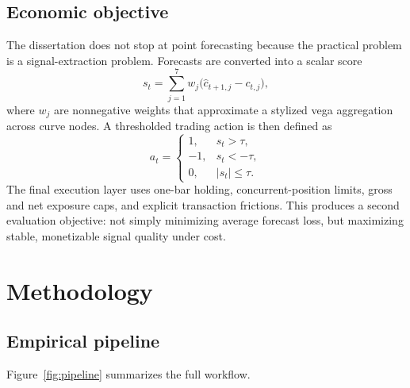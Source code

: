 \documentclass[12pt]{report}
\begin{document}
\section{Economic objective}
The dissertation does not stop at point forecasting because the practical problem is a signal-extraction problem. Forecasts are converted into a scalar score
\[
s_t=\sum_{j=1}^{7}w_j\big(\hat{c}_{t+1,j}-c_{t,j}\big),
\]
where \(w_j\) are nonnegative weights that approximate a stylized vega aggregation across curve nodes. A thresholded trading action is then defined as
\[
a_t=
\begin{cases}
1, & s_t>\tau,\\
-1, & s_t<-\tau,\\
0, & |s_t|\le \tau.
\end{cases}
\]
The final execution layer uses one-bar holding, concurrent-position limits, gross and net exposure caps, and explicit transaction frictions. This produces a second evaluation objective: not simply minimizing average forecast loss, but maximizing stable, monetizable signal quality under cost.

\chapter{Methodology}

\section{Empirical pipeline}
Figure~\ref{fig:pipeline} summarizes the full workflow.
\end{document}
